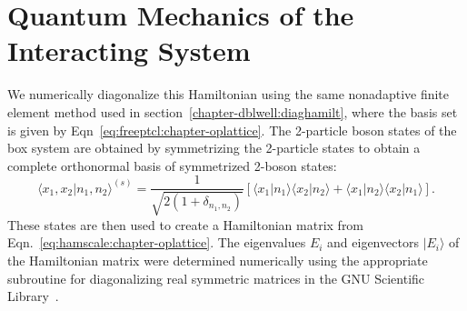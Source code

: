 \section{\label{sec:3} Quantum Mechanics of the Interacting System}

We numerically diagonalize this Hamiltonian using the same nonadaptive finite element method used in section~\ref{chapter-dblwell:diaghamilt}, where the basis set is given by Eqn~\ref{eq:freeptcl:chapter-oplattice}. The 2-particle boson states of the box system are obtained by symmetrizing the 2-particle states to obtain a complete orthonormal basis of symmetrized 2-boson states:
%
\begin{equation}
{\langle}x_1,x_2\vert n_1,n_2{\rangle} ^{(s)}=\frac{1}{\sqrt{2(1+\delta_{n_1,n_2})}} 
[{\langle}x_1|n_1\rangle{\langle}x_2|n_2\rangle +{\langle}x_1|n_2\rangle{\langle}x_2|n_1\rangle ].
\label{eq:symm:chapter-oplattice}
\end{equation}
These states are then used to create a Hamiltonian matrix from Eqn.~\ref{eq:hamscale:chapter-oplattice}. The eigenvalues $E_i$ and eigenvectors $\vert E_i \rangle$ of the Hamiltonian matrix were determined numerically using the appropriate subroutine for diagonalizing real symmetric matrices in the GNU Scientific Library~\cite{galassi:gsl}. 


